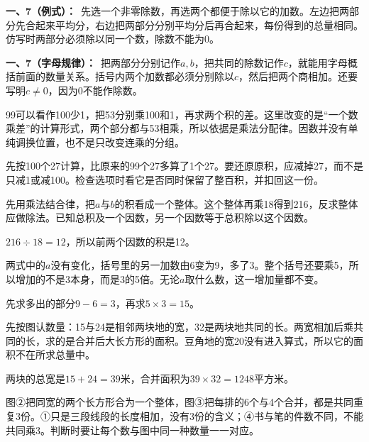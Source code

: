 \documentclass[multi=snippet,border=0pt]{standalone}
\newenvironment{snippet}[3]{\begin{minipage}{#1bp}\color{answerred}\fontsize{#2}{#3}\selectfont\raggedright}{\end{minipage}}
\begin{document}
\begin{snippet}{505}{11.5}{14}\textbf{一、7（例式）：}\ 先选一个非零除数，再选两个都便于除以它的加数。左边把两部分先合起来平均分，右边把两部分分别平均分后再合起来，每份得到的总量相同。仿写时两部分必须除以同一个数，除数不能为0。\end{snippet}
\begin{snippet}{505}{11.5}{14}\textbf{一、7（字母规律）：}\ 把两部分分别记作\(a,b\)，把共同的除数记作\(c\)，就能用字母概括前面的数量关系。括号内两个加数都必须分别除以\(c\)，然后把两个商相加。还要写明\(c\ne0\)，因为0不能作除数。\end{snippet}
\begin{snippet}{505}{11.5}{14}99可以看作100少1，把53分别乘100和1，再求两个积的差。这里改变的是“一个数乘差”的计算形式，两个部分都与53相乘，所以依据是乘法分配律。因数并没有单纯调换位置，也不是只改变连乘的分组。\end{snippet}
\begin{snippet}{505}{11.5}{14}先按100个27计算，比原来的99个27多算了1个27。要还原原积，应减掉27，而不是只减1或减100。检查选项时看它是否同时保留了整百积，并扣回这一份。\end{snippet}
\begin{snippet}{505}{11.5}{14}先用乘法结合律，把\(a\)与\(b\)的积看成一个整体。这个整体再乘18得到216，反求整体应做除法。已知总积及一个因数，另一个因数等于总积除以这个因数。\par \(216\div18=12\)，所以前两个因数的积是12。\end{snippet}
\begin{snippet}{505}{11.5}{14}两式中的\(a\)没有变化，括号里的另一加数由6变为9，多了3。整个括号还要乘5，所以增加的不是3本身，而是3的5倍。无论\(a\)取什么数，这一增加量都不变。\par 先求多出的部分\(9-6=3\)，再求\(5\times3=15\)。\end{snippet}
\begin{snippet}{505}{11.5}{14}先按图认数量：15与24是相邻两块地的宽，32是两块地共同的长。两宽相加后乘共同的长，求的是合并后大长方形的面积。豆角地的宽20没有进入算式，所以它的面积不在所求总量中。\par 两块的总宽是\(15+24=39\)米，合并面积为\(39\times32=1248\)平方米。\end{snippet}
\begin{snippet}{505}{11.5}{14}图②把同宽的两个长方形合为一个整体，图③把每排的6个与4个合并，都是共同重复3份。①只是三段线段的长度相加，没有3份的含义；④书与笔的件数不同，不能共同乘3。判断时要让每个数与图中同一种数量一一对应。\end{snippet}
\end{document}

